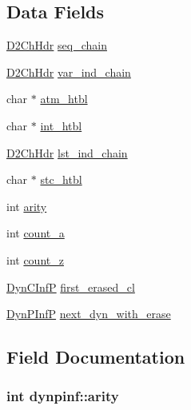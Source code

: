 \subsection*{Data Fields}
\begin{DoxyCompactItemize}
\item 
\hyperlink{structD2ChHdr}{D2\+Ch\+Hdr} \hyperlink{structdynpinf_a7fd9dcc867aa4461a78fd7ea113fe30e}{seq\+\_\+chain}
\item 
\hyperlink{structD2ChHdr}{D2\+Ch\+Hdr} \hyperlink{structdynpinf_a81ff1365c770d4e9e503ec13d0829c89}{var\+\_\+ind\+\_\+chain}
\item 
char $\ast$ \hyperlink{structdynpinf_a647b214d180d3239102e9a3137cd2c50}{atm\+\_\+htbl}
\item 
char $\ast$ \hyperlink{structdynpinf_a7e89d876755097ac24867ef0c002572d}{int\+\_\+htbl}
\item 
\hyperlink{structD2ChHdr}{D2\+Ch\+Hdr} \hyperlink{structdynpinf_a1c4ab87dddfafc7e912446a2cc391e3f}{lst\+\_\+ind\+\_\+chain}
\item 
char $\ast$ \hyperlink{structdynpinf_a34e514b87f630efa4c7d2936979e7735}{stc\+\_\+htbl}
\item 
int \hyperlink{structdynpinf_a06c4048e8638d3a47c4b48d5b6384516}{arity}
\item 
int \hyperlink{structdynpinf_aacc4edd647989f5a014730830390c05d}{count\+\_\+a}
\item 
int \hyperlink{structdynpinf_a90b999f0c08d5d26be5de1f30fd4a83d}{count\+\_\+z}
\item 
\hyperlink{dynam__supp_8h_ae9665ae9a3ee194834c9995b875aed48}{Dyn\+C\+InfP} \hyperlink{structdynpinf_a1e974f17af18887bef7754c00313c714}{first\+\_\+erased\+\_\+cl}
\item 
\hyperlink{dynam__supp_8h_a23ac55128ef278dc030519f2aea275bd}{Dyn\+P\+InfP} \hyperlink{structdynpinf_a5845421aa8bf227923c6ed1073c32b17}{next\+\_\+dyn\+\_\+with\+\_\+erase}
\end{DoxyCompactItemize}


\subsection{Field Documentation}
\subsubsection[{\texorpdfstring{arity}{arity}}]{\setlength{\rightskip}{0pt plus 5cm}int dynpinf\+::arity}\hypertarget{structdynpinf_a06c4048e8638d3a47c4b48d5b6384516}{}\label{structdynpinf_a06c4048e8638d3a47c4b48d5b6384516}
